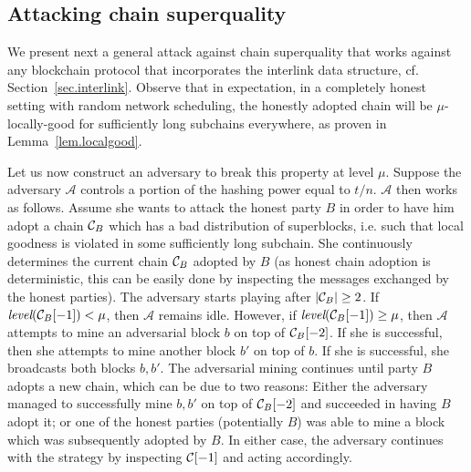 \subsection{Attacking chain superquality}
\label{subsec.superquality-attack}

We present next a general attack against chain superquality
that works against any blockchain protocol that incorporates
the interlink data structure, cf. Section~\ref{sec.interlink}.
Observe that in expectation, in a
completely honest setting with random network scheduling, the honestly adopted
chain will be $\mu$-locally-good for sufficiently long subchains everywhere, as
proven in Lemma~\ref{lem.localgood}.

Let us now construct an adversary to break this property at level $\mu$. Suppose
the adversary $\mathcal{A}$ controls a portion of the hashing power equal to
$t/n$. $\mathcal{A}$ then works as follows. Assume she wants to attack the
honest party $B$ in order to have him adopt a chain $\mathcal{C}_B$ which has a bad
distribution of superblocks, i.e. such that local goodness is violated in some
sufficiently long subchain. She continuously determines the current chain
$\mathcal{C}_B$ adopted by $B$ (as honest chain adoption is deterministic, this can
be easily done by inspecting the messages exchanged by the honest parties). The
adversary starts playing after $|\mathcal{C}_B| \geq 2$. If
$\textit{level}(\mathcal{C}_B[-1]) < \mu$, then $\mathcal{A}$ remains idle. However,
if $\textit{level}(\mathcal{C}_B[-1]) \geq \mu$, then $\mathcal{A}$ attempts to mine
an adversarial block $b$ on top of $\mathcal{C}_B[-2]$. If she is successful, then she
attempts to mine another block $b'$ on top of $b$. If she is successful, she
broadcasts both blocks $b, b'$. The adversarial mining continues until party $B$
adopts a new chain, which can be due to two reasons: Either the adversary
managed to successfully mine $b, b'$ on top of $\mathcal{C}_B[-2]$ and succeeded in
having $B$ adopt it; or one of the honest parties (potentially $B$) was able to
mine a block which was subsequently adopted by $B$. In either case, the
adversary continues with the strategy by inspecting $\mathcal{C}[-1]$ and acting
accordingly.


